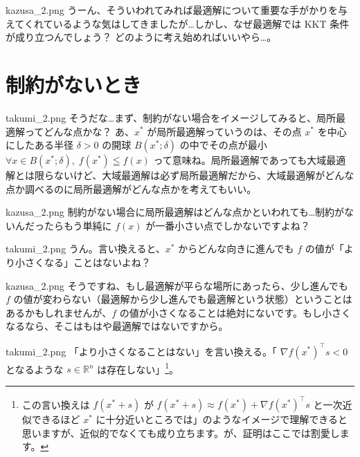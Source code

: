 \documentclass[b5paper,xelatex,ja=standard,10pt]{bxjsarticle}
\begin{document}
\begin{SERIFU}[colback=PaleIris, colbacktitle=PaleIris2]{kazusa_2.png}
うーん、そういわれてみれば最適解について重要な手がかりを与えてくれているような気はしてきましたが…しかし、なぜ最適解では KKT 条件が成り立つんでしょう？ どのように考え始めればいいやら…。
\end{SERIFU}


\renewcommand*{\mysectiontitle}{制約がないとき}
\section*{\mysectiontitle}
\addcontentsline{toc}{section}{\mysectiontitle}
\vspace{3pt}

\begin{SERIFU}[colback=PaleGold, colbacktitle=PaleGold2]{takumi_2.png}
そうだな…まず、制約がない場合をイメージしてみると、局所最適解ってどんな点かな？ あ、$x^\ast$ が局所最適解っていうのは、その点 $x^\ast$ を中心にしたある半径 $\delta > 0$ の開球 $ B(x^\ast; \delta)$ の中でその点が最小 $ \forall x \in B(x^\ast; \delta), \; f(x^\ast) \leqq f(x)$ って意味ね。局所最適解であっても大域最適解とは限らないけど、大域最適解は必ず局所最適解だから、大域最適解がどんな点か調べるのに局所最適解がどんな点かを考えてもいい。
\end{SERIFU}

\begin{SERIFU}[colback=PaleIris, colbacktitle=PaleIris2]{kazusa_2.png}
制約がない場合に局所最適解はどんな点かといわれても…制約がないんだったらもう単純に $f(x)$ が一番小さい点でしかないですよね？
\end{SERIFU}

\begin{SERIFU}[colback=PaleGold, colbacktitle=PaleGold2]{takumi_2.png}
うん。言い換えると、$x^\ast$ からどんな向きに進んでも $f$ の値が「より小さくなる」ことはないよね？
\end{SERIFU}

\begin{SERIFU}[colback=PaleIris, colbacktitle=PaleIris2]{kazusa_2.png}
そうですね、もし最適解が平らな場所にあったら、少し進んでも $f$ の値が変わらない（最適解から少し進んでも最適解という状態）ということはあるかもしれませんが、$f$ の値が小さくなることは絶対にないです。もし小さくなるなら、そこはもはや最適解ではないですから。
\end{SERIFU}

\begin{SERIFU}[colback=PaleGold, colbacktitle=PaleGold2]{takumi_2.png}
「より小さくなることはない」を言い換える。「 $ \nabla f(x^\ast)^\top s < 0$ となるような $s \in \mathbb{R}^n$ は存在しない」\footnote{この言い換えは $f(x^\ast + s)$ が $f(x^\ast + s) \approx f(x^\ast) + \nabla f(x^\ast)^\top s$ と一次近似できるほど $x^\ast$ に十分近いところでは」のようなイメージで理解できると思いますが、近似的でなくても成り立ちます。が、証明はここでは割愛します。}。
\end{SERIFU}
\end{document}
